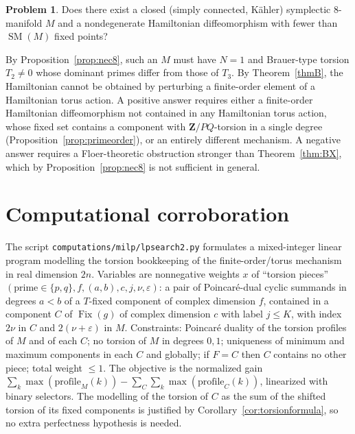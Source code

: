 \documentclass[11pt]{amsart}
\numberwithin{equation}{section}
\theoremstyle{definition}
\newtheorem{problem}[theorem]{Problem}
\theoremstyle{remark}
\newcommand{\Z}{\mathbf Z}
\DeclareMathOperator{\SM}{SM}
\DeclareMathOperator{\Fix}{Fix}
\begin{document}
\begin{problem}\label{prob:dim8}
Does there exist a closed (simply connected, K\"ahler) symplectic
$8$-manifold $M$ and a nondegenerate Hamiltonian diffeomorphism with fewer
than $\SM(M)$ fixed points?
\end{problem}

By Proposition~\ref{prop:nec8}, such an $M$ must have $N=1$ and
Brauer-type torsion $T_2\ne0$ whose dominant primes differ from those of
$T_3$. By Theorem~\ref{thmB}, the Hamiltonian cannot be obtained by
perturbing a finite-order element of a Hamiltonian torus action. A
positive answer requires either a finite-order Hamiltonian diffeomorphism
not contained in any Hamiltonian torus action, whose fixed set contains a
component with $\Z/PQ$-torsion in a single degree
(Proposition~\ref{prop:primeorder}), or an entirely different mechanism. A negative answer requires a Floer-theoretic obstruction
stronger than Theorem~\ref{thm:BX}, which by Proposition~\ref{prop:nec8} is
not sufficient in general.

\appendix
\section{Computational corroboration}\label{app:milp}

The script \nolinkurl{computations/milp/lpsearch2.py} formulates a mixed-integer linear program
modelling the torsion bookkeeping of the finite-order/torus mechanism in
real dimension $2n$. Variables are nonnegative weights $x$ of
``torsion pieces'' $(\text{prime}\in\{p,q\},f,(a,b),c,j,\nu,\varepsilon)$: a
pair of Poincar\'e-dual cyclic summands in degrees $a<b$ of a $T$-fixed
component of complex dimension $f$, contained in a component $C$ of
$\Fix(g)$ of complex dimension $c$ with label $j\le K$, with index $2\nu$
in $C$ and $2(\nu+\varepsilon)$ in $M$. Constraints: Poincar\'e duality of
the torsion profiles of $M$ and of each $C$; no torsion of $M$ in degrees
$0,1$; uniqueness of minimum and maximum components in each $C$ and
globally; if $F=C$ then $C$ contains no other piece; total weight $\le1$.
The objective is the normalized gain
$\sum_k\max(\text{profile}_M(k))-\sum_C\sum_k\max(\text{profile}_C(k))$,
linearized with binary selectors. The modelling of the torsion of $C$ as
the sum of the shifted torsion of its fixed components is justified by
Corollary~\ref{cor:torsionformula}, so no extra perfectness hypothesis is
needed.
\end{document}
